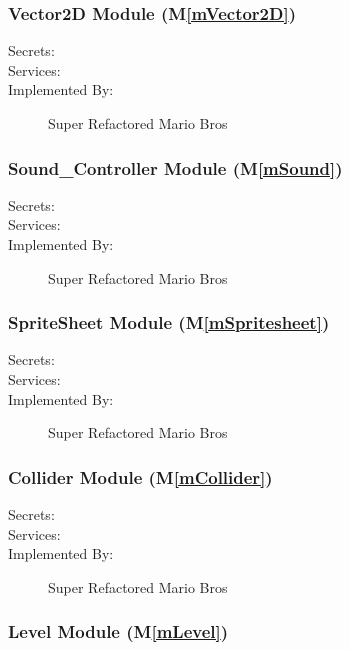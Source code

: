 \documentclass[12pt, titlepage]{article}
\newcommand{\mref}[1]{M\ref{#1}}
\begin{document}
\subsubsection{Vector2D Module (\mref{mVector2D})}

\begin{description}
\item[Secrets:] 
\item[Services:] 
\item[Implemented By:] Super Refactored Mario Bros
\end{description}

\subsubsection{Sound\_Controller Module (\mref{mSound})}

\begin{description}
\item[Secrets:] 
\item[Services:] 
\item[Implemented By:] Super Refactored Mario Bros
\end{description}

\subsubsection{SpriteSheet Module (\mref{mSpritesheet})}

\begin{description}
\item[Secrets:] 
\item[Services:] 
\item[Implemented By:] Super Refactored Mario Bros
\end{description}

\subsubsection{Collider Module (\mref{mCollider})}

\begin{description}
\item[Secrets:] 
\item[Services:] 
\item[Implemented By:] Super Refactored Mario Bros
\end{description}

\subsubsection{Level Module (\mref{mLevel})}
\end{document}
